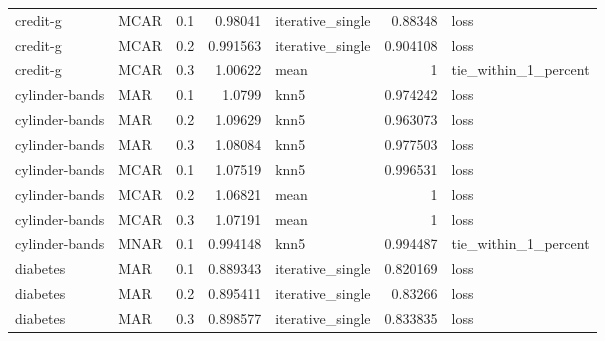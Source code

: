 \begin{table}[ht]
{\begin{tabular}{llrrlrl}
 credit-g             & MCAR        &         0.1 &                          0.98041  & iterative\_single &                           0.88348  & loss                 \\
 credit-g             & MCAR        &         0.2 &                          0.991563 & iterative\_single &                           0.904108 & loss                 \\
 credit-g             & MCAR        &         0.3 &                          1.00622  & mean             &                           1        & tie\_within\_1\_percent \\
 cylinder-bands       & MAR         &         0.1 &                          1.0799   & knn5             &                           0.974242 & loss                 \\
 cylinder-bands       & MAR         &         0.2 &                          1.09629  & knn5             &                           0.963073 & loss                 \\
 cylinder-bands       & MAR         &         0.3 &                          1.08084  & knn5             &                           0.977503 & loss                 \\
 cylinder-bands       & MCAR        &         0.1 &                          1.07519  & knn5             &                           0.996531 & loss                 \\
 cylinder-bands       & MCAR        &         0.2 &                          1.06821  & mean             &                           1        & loss                 \\
 cylinder-bands       & MCAR        &         0.3 &                          1.07191  & mean             &                           1        & loss                 \\
 cylinder-bands       & MNAR        &         0.1 &                          0.994148 & knn5             &                           0.994487 & tie\_within\_1\_percent \\
 diabetes             & MAR         &         0.1 &                          0.889343 & iterative\_single &                           0.820169 & loss                 \\
 diabetes             & MAR         &         0.2 &                          0.895411 & iterative\_single &                           0.83266  & loss                 \\
 diabetes             & MAR         &         0.3 &                          0.898577 & iterative\_single &                           0.833835 & loss                 \\

\end{tabular}}
\end{table}
